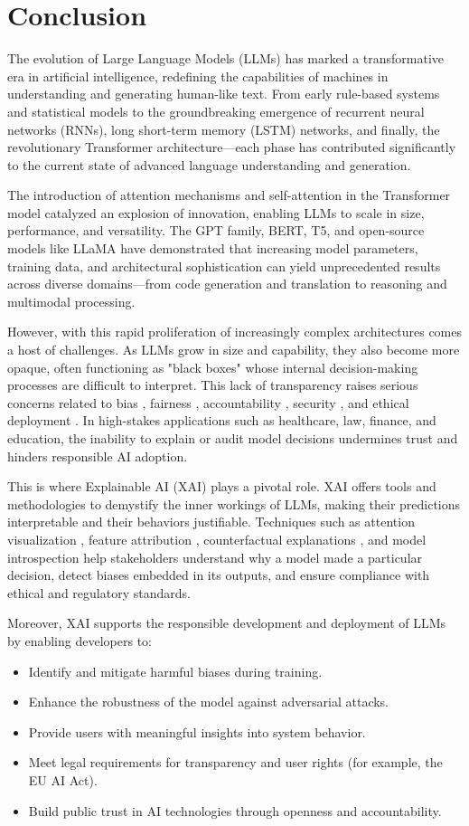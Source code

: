 \documentclass[conference]{IEEEtran}
\begin{document}
\section{Conclusion}
The evolution of Large Language Models (LLMs) has marked a transformative era in artificial intelligence, redefining the capabilities of machines in understanding and generating human-like text. From early rule-based systems and statistical models to the groundbreaking emergence of recurrent neural networks (RNNs), long short-term memory (LSTM) networks, and finally, the revolutionary Transformer architecture—each phase has contributed significantly to the current state of advanced language understanding and generation.

The introduction of attention mechanisms and self-attention in the Transformer model catalyzed an explosion of innovation, enabling LLMs to scale in size, performance, and versatility. The GPT family, BERT, T5, and open-source models like LLaMA have demonstrated that increasing model parameters, training data, and architectural sophistication can yield unprecedented results across diverse domains—from code generation and translation to reasoning and multimodal processing.

However, with this rapid proliferation of increasingly complex architectures comes a host of challenges. As LLMs grow in size and capability, they also become more opaque, often functioning as "black boxes" whose internal decision-making processes are difficult to interpret. This lack of transparency raises serious concerns related to bias , fairness , accountability , security , and ethical deployment . In high-stakes applications such as healthcare, law, finance, and education, the inability to explain or audit model decisions undermines trust and hinders responsible AI adoption.

This is where Explainable AI (XAI) plays a pivotal role. XAI offers tools and methodologies to demystify the inner workings of LLMs, making their predictions interpretable and their behaviors justifiable. Techniques such as attention visualization , feature attribution , counterfactual explanations , and model introspection help stakeholders understand why a model made a particular decision, detect biases embedded in its outputs, and ensure compliance with ethical and regulatory standards.

Moreover, XAI supports the responsible development and deployment of LLMs by enabling developers to:
\begin{itemize}
    \item Identify and mitigate harmful biases during training.
    \item Enhance the robustness of the model against adversarial attacks.
    \item Provide users with meaningful insights into system behavior.
    \item Meet legal requirements for transparency and user rights (for example, the EU AI Act).
    \item Build public trust in AI technologies through openness and accountability.
\end{itemize}
\end{document}
